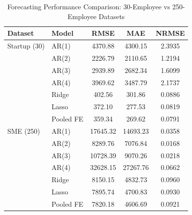 \begin{table}[htbp]
\centering
\caption{Forecasting Performance Comparison: 30-Employee vs 250-Employee Datasets}
\label{tab:dataset_comparison}
\begin{tabular}{llccc}
\toprule
\textbf{Dataset} & \textbf{Model} & \textbf{RMSE} & \textbf{MAE} & \textbf{NRMSE} \\
\midrule
Startup (30) & AR(1) & 4370.88 & 4300.15 & 2.3935 \\
& AR(2) & 2226.79 & 2110.65 & 1.2194 \\
& AR(3) & 2939.89 & 2682.34 & 1.6099 \\
& AR(4) & 3969.62 & 3487.79 & 2.1737 \\
& Ridge & 402.56 & 301.86 & 0.0886 \\
& Lasso & 372.10 & 277.53 & 0.0819 \\
& Pooled FE & 359.34 & 269.62 & 0.0791 \\
\midrule
SME (250) & AR(1) & 17645.32 & 14693.23 & 0.0358 \\
& AR(2) & 8289.76 & 7076.84 & 0.0168 \\
& AR(3) & 10728.39 & 9070.26 & 0.0218 \\
& AR(4) & 32628.15 & 27267.76 & 0.0662 \\
& Ridge & 8150.15 & 4832.73 & 0.0960 \\
& Lasso & 7895.74 & 4700.83 & 0.0930 \\
& Pooled FE & 7820.18 & 4606.69 & 0.0921 \\
\midrule
\bottomrule
\end{tabular}
\end{table}